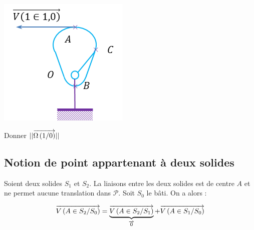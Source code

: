\documentclass[11pt,oneside]{article}
\begin{document}
\begin{exemple}
\begin{minipage}[c]{.3\linewidth}
\begin{center}
\includegraphics[width=\textwidth]{png/came}
\end{center}
\end{minipage}\hfill
\begin{minipage}[c]{.3\linewidth}
\begin{center}
Donner $||\overrightarrow{\Omega\left( {1}/{0}\right)}||$
\end{center}
\end{minipage}


\end{exemple}


\subsection{Notion de point appartenant à deux solides}
\begin{resultat}
Soient deux solides $S_1$ et $S_2$. La liaisons entre les deux solides est de centre $A$ et ne permet aucune translation dans $\mathcal{P}$. Soit $S_0$ le bâti.
On a alors :

$$
\overrightarrow{V\left( {A} \in {S_2}/{S_0}\right)} =\underbrace{\overrightarrow{V\left( {A} \in {S_2}/{S_1}\right)}}_{\overrightarrow{0}} + \overrightarrow{V\left( {A} \in {S_1}/{S_0}\right)}
$$

\end{resultat}
\end{document}
